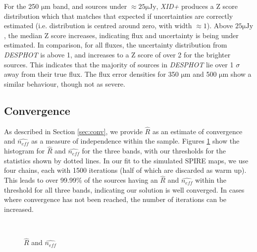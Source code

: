 \documentclass[useAMS,usenatbib]{mnras}
\begin{document}
For the 250 $\mathrm{\mu m}$ band, and sources under $\approx25\mathrm{\mu Jy}$, \emph{XID+} produces a Z score distribution which that matches that expected if uncertainties are correctly estimated (i.e. distribution is centred around zero, with width $\approx 1$). Above $25\mathrm{\mu Jy}$, the median Z score increases, indicating flux and uncertainty is being under estimated. In comparison, for all fluxes, the uncertainty distribution from \emph{DESPHOT} is above 1, and increases to a Z score of over 2 for the brighter sources. This indicates that the majority of sources in \emph{DESPHOT} lie over 1 $\sigma$ away from their true flux. The flux error densities for 350 $\mathrm{\mu m}$ and 500 $\mathrm{\mu m}$ show a similar behaviour, though not as severe.

\subsection{Convergence}
As described in Section \ref{sec:conv}, we provide $\hat{R}$ as an estimate of convergence and $\hat{n_{eff}}$ as a measure of independence within the sample. Figures \ref{fig:converg} show the histogram for $\hat{R}$ and $\hat{n_{eff}}$ for the three bands, with our thresholds for the statistics shown by dotted lines. In our fit to the simulated SPIRE maps, we use four chains, each with 1500 iterations (half of which are discarded as warm up). This leads to over 99.99\% of the sources having an $\hat{R}$ and $\hat{n_{eff}}$ within the threshold for all three bands, indicating our solution is well converged. In cases where convergence has not been reached, the number of iterations can be increased.
\begin{figure}
\\
\caption{$\hat{R}$ and $\hat{n_{eff}}$}\label{fig:converg}
\end{figure}
\end{document}
